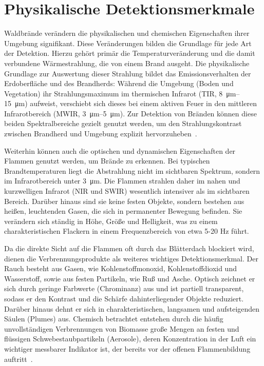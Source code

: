 \chapter{Physikalische Detektionsmerkmale}\label{ch:physikalischedetektionsmerkmale}

Waldbrände verändern die physikalischen und chemischen Eigenschaften ihrer Umgebung signifikant. Diese Veränderungen bilden die Grundlage für jede Art der Detektion. 
Hierzu gehört primär die Temperaturveränderung und die damit verbundene Wärmestrahlung, die von einem Brand ausgeht. Die physikalische Grundlage zur Auswertung dieser Strahlung bildet das Emissionsverhalten der Erdoberfläche und des Brandherds: Während die Umgebung (Boden und Vegetation) ihr Strahlungsmaximum im thermischen Infrarot (TIR, \SIrange{8}{15}{\micro\meter}) aufweist, verschiebt sich dieses bei einem aktiven Feuer in den mittleren Infrarotbereich (MWIR, \SIrange{3}{5}{\micro\meter}). Zur Detektion von Bränden können diese beiden Spektralbereiche gezielt genutzt werden, um den Strahlungskontrast zwischen Brandherd und Umgebung explizit hervorzuheben~\cite{Bernhard2010}.

Weiterhin können auch die optischen und dynamischen Eigenschaften der Flammen genutzt werden, um Brände zu erkennen. Bei typischen Brandtemperaturen liegt die Abstrahlung nicht im sichtbaren Spektrum, sondern im Infrarotbereich unter \qty{3}{\micro\meter}. Die Flammen strahlen daher im nahen und kurzwelligen Infrarot (\acs{NIR} und \acs{SWIR}) wesentlich intensiver als im sichtbaren Bereich. Darüber hinaus sind sie keine festen Objekte, sondern bestehen aus heißen, leuchtenden Gasen, die sich in permanenter Bewegung befinden. Sie verändern sich ständig in Höhe, Größe und Helligkeit, was zu einem charakteristischen Flackern in einem Frequenzbereich von etwa 5-20 Hz führt. 

Da die direkte Sicht auf die Flammen oft durch das Blätterdach blockiert wird, dienen die Verbrennungsprodukte als weiteres wichtiges Detektionsmerkmal. Der Rauch besteht aus Gasen, wie Kohlenstoffmonoxid, Kohlenstoffdioxid und Wasserstoff, sowie aus festen Partikeln, wie Ruß und Asche. Optisch zeichnet er sich durch geringe Farbwerte (Chrominanz) aus und ist partiell transparent, sodass er den Kontrast und die Schärfe dahinterliegender Objekte reduziert. Darüber hinaus dehnt er sich in charakteristischen, langsamen und aufsteigenden Säulen (Plumes) aus. Chemisch betrachtet entstehen durch die häufig unvollständigen Verbrennungen von Biomasse große Mengen an festen und flüssigen Schwebestaubpartikeln (Aerosole), deren Konzentration in der Luft ein wichtiger messbarer Indikator ist, der bereits vor der offenen Flammenbildung auftritt~\cite{Stocker2024}.

